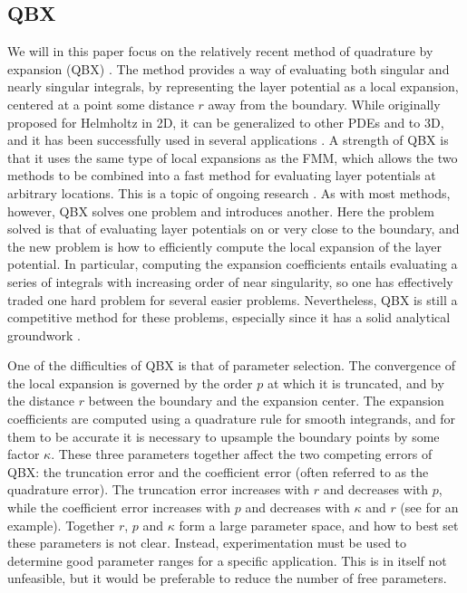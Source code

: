 \documentclass[hidelinks]{siamart1116}
\begin{document}
\subsection{QBX}
We will in this paper focus on the relatively recent method of
quadrature by expansion (QBX) \cite{Barnett2014,Klockner2013}. The
method provides a way of evaluating both singular and nearly singular
integrals, by representing the layer potential as a local expansion,
centered at a point some distance $r$ away from the boundary. While
originally proposed for Helmholtz in 2D, it can be generalized to
other PDEs and to 3D, and it has been successfully used in several
applications \cite{AfKlinteberg2016qbx,Askham2016a,Ricketson2016}. A
strength of QBX is that it uses the same type of local expansions as
the FMM, which allows the two methods to be combined into a fast
method for evaluating layer potentials at arbitrary locations. This is
a topic of ongoing research \cite{Rachh2016}. As with most methods,
however, QBX solves one problem and introduces another. Here the
problem solved is that of evaluating layer potentials on or very close
to the boundary, and the new problem is how to efficiently compute the
local expansion of the layer potential. In particular, computing the
expansion coefficients entails evaluating a series of integrals with
increasing order of near singularity, so one has effectively traded
one hard problem for several easier problems. Nevertheless, QBX is
still a competitive method for these problems, especially since it has
a solid analytical groundwork \cite{Epstein2013}.

One of the difficulties of QBX is that of parameter selection. The
convergence of the local expansion is governed by the order $p$ at
which it is truncated, and by the distance $r$ between the boundary
and the expansion center. The expansion coefficients are computed
using a quadrature rule for smooth integrands, and for them to be
accurate it is necessary to upsample the boundary points by some
factor $\kappa$. These three parameters together affect the two
competing errors of QBX: the truncation error and the coefficient
error (often referred to as the quadrature error). The truncation
error increases with $r$ and decreases with $p$, while the coefficient
error increases with $p$ and decreases with ${\kappa}$ and $r$ (see
\cite[Fig. 3]{AfKlinteberg2016qbx} for an example). Together $r$, $p$
and $\kappa$ form a large parameter space, and how to best set these
parameters is not clear. Instead, experimentation must be used to
determine good parameter ranges for a specific application. This is in
itself not unfeasible, but it would be preferable to reduce the number
of free parameters.
\end{document}
